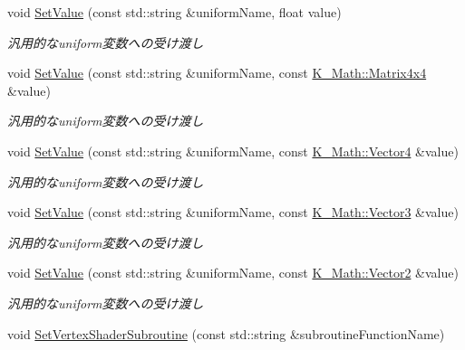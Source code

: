 \begin{DoxyCompactItemize}
void \mbox{\hyperlink{class_k___graphics_1_1_shader_class_a5cbcd8eca343a5e614edaf4def827ce1}{Set\+Value}} (const std\+::string \&uniform\+Name, float value)
\begin{DoxyCompactList}\small\item\em 汎用的なuniform変数への受け渡し \end{DoxyCompactList}\item 
void \mbox{\hyperlink{class_k___graphics_1_1_shader_class_a48af5c9168088ba35d222cb67f200a4e}{Set\+Value}} (const std\+::string \&uniform\+Name, const \mbox{\hyperlink{namespace_k___math_a345271af9d32dff2c964bc679b13b45c}{K\+\_\+\+Math\+::\+Matrix4x4}} \&value)
\begin{DoxyCompactList}\small\item\em 汎用的なuniform変数への受け渡し \end{DoxyCompactList}\item 
void \mbox{\hyperlink{class_k___graphics_1_1_shader_class_a90c6b0fa2ffc9016b442833b138b8a5a}{Set\+Value}} (const std\+::string \&uniform\+Name, const \mbox{\hyperlink{namespace_k___math_a8d82de9de17eae460600de1e40e8a01f}{K\+\_\+\+Math\+::\+Vector4}} \&value)
\begin{DoxyCompactList}\small\item\em 汎用的なuniform変数への受け渡し \end{DoxyCompactList}\item 
void \mbox{\hyperlink{class_k___graphics_1_1_shader_class_a0f81ce90173b0afe7dd98ea3c18f4913}{Set\+Value}} (const std\+::string \&uniform\+Name, const \mbox{\hyperlink{namespace_k___math_a66884d78082c39ada4091c211f3570f8}{K\+\_\+\+Math\+::\+Vector3}} \&value)
\begin{DoxyCompactList}\small\item\em 汎用的なuniform変数への受け渡し \end{DoxyCompactList}\item 
void \mbox{\hyperlink{class_k___graphics_1_1_shader_class_a37f4da2763c441b21cf9171268375d05}{Set\+Value}} (const std\+::string \&uniform\+Name, const \mbox{\hyperlink{namespace_k___math_a41eb0c2c69c938cd59989eb3241cefb2}{K\+\_\+\+Math\+::\+Vector2}} \&value)
\begin{DoxyCompactList}\small\item\em 汎用的なuniform変数への受け渡し \end{DoxyCompactList}\item 
void \mbox{\hyperlink{class_k___graphics_1_1_shader_class_a48edec1492bfa0fe8d8cab265c24bbbd}{Set\+Vertex\+Shader\+Subroutine}} (const std\+::string \&subroutine\+Function\+Name)

\end{DoxyCompactItemize}
